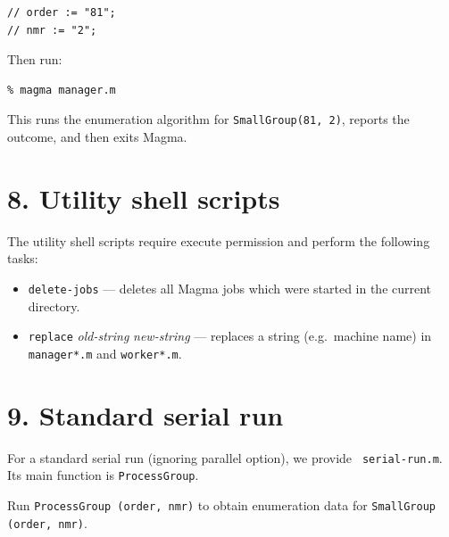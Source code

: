 \documentclass[a4paper,11pt]{article}
\begin{document}
\begin{lstlisting}
// order := "81";
// nmr := "2";
\end{lstlisting}

Then run:

\begin{lstlisting}
% magma manager.m
\end{lstlisting}

This runs the enumeration algorithm for \texttt{SmallGroup(81, 2)}, reports the outcome, and then exits Magma.

\section*{8. Utility shell scripts}

The utility shell scripts require execute permission and perform the following tasks:

\begin{itemize}[noitemsep]
    \item \texttt{delete-jobs} --- deletes all Magma jobs which were started in the current directory.
    \item \texttt{replace} \textit{old-string} \textit{new-string} --- replaces a string (e.g.\ machine name) in \texttt{manager*.m} and \texttt{worker*.m}.
\end{itemize}

\section*{9. Standard serial run}

For a standard serial run (ignoring parallel option), we provide {\tt 
serial-run.m}. Its main function is {\tt ProcessGroup}. 

Run {\tt ProcessGroup (order, nmr)} to obtain enumeration data
for {\tt SmallGroup (order, nmr)}.
\end{document}
